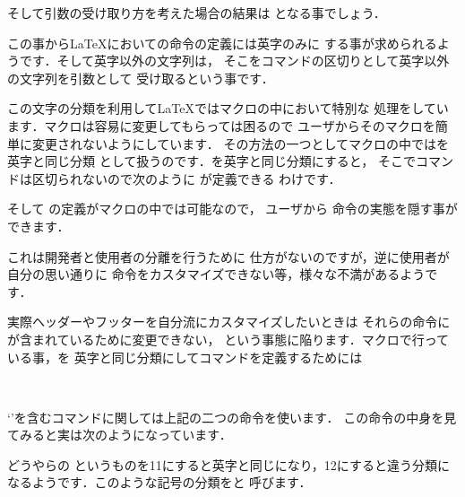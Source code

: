 そして引数の受け取り方を考えた場合の結果は
となる事でしょう．

この事から{\LaTeX}においての命令の定義には英字のみに
する事が求められるようです．そして英字以外の文字列は，
そこをコマンドの区切りとして英字以外の文字列を引数として
受け取るという事です．

この文字の分類を利用して{\LaTeX}ではマクロの中において特別な
処理をしています．マクロは容易に変更してもらっては困るので
ユーザからそのマクロを簡単に変更されないようにしています．
その方法の一つとしてマクロの中ではを英字と同じ分類%
として扱うのです．を英字と同じ分類にすると，
そこでコマンドは区切られないので次のように  が定義できる
わけです．

\begin{InTeX}
\newcommand{\two@args}[2]{あ，#1だよ，ほら#2}
\end{InTeX}

そして  の定義がマクロの中では可能なので，
ユーザから  命令の実態を隠す事ができます．

\begin{InTeX}
\newcommand{\two@args}[2]{あ，#1だよ，ほら#2}
\newcommand{\twoArgs}{\two@args}
\end{InTeX}

これは開発者と使用者の分離を行うために
仕方がないのですが，逆に使用者が自分の思い通りに
命令をカスタマイズできない等，様々な不満があるようです．

実際ヘッダーやフッターを自分流にカスタマイズしたいときは
それらの命令にが含まれているために変更できない，
という事態に陥ります．マクロで行っている事，を
英字と同じ分類にしてコマンドを定義するためには
\begin{Syntax}
 \\
  
\end{Syntax}

`'を含むコマンドに関しては上記の二つの命令を使います．
この命令の中身を見てみると実は次のようになっています．

\begin{InTeX}
\def\makeatletter{\catcode`\@11\relax}
\def\makeatother{\catcode`\@12\relax}
\end{InTeX}

どうやらの{}
というものを11にすると英字と同じになり，12にすると違う分類に
なるようです．このような記号の分類を{}と
呼びます．


